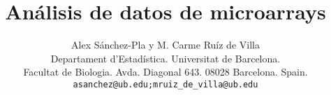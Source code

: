 \title{An\'alisis de datos de microarrays} %


\author{Alex S\'anchez-Pla y M. Carme Ru\'iz de Villa\\
Departament d'Estad\'istica. Universitat de Barcelona.\\
Facultat de Biologia. Avda. Diagonal 643. 08028 Barcelona. Spain.\\
\texttt{asanchez@ub.edu;mruiz\_de\_villa@ub.edu}}

\newcommand{\modul}{M\'odulo 6} %
\newcommand{\credits}{xx} %
\renewcommand{\nroregistre}{PID_00191030} %




\newcommand{\nommodul}{An\'alisis de datos de microarrays} %
\newcommand{\modulEncap}{$\text{ }\bullet$ M\'odulo XXX} %



\usepackage{hyperref} %
\usepackage{Sweave}
\usepackage{supertabular}
\usepackage{underscore}

\newcommand{\Rfunction}[1]{{\texttt{#1}}}
\newcommand{\Rmethod}[1]{{\texttt{#1}}}

\newcommand{\Robject}[1]{{\texttt{#1}}}
\newcommand{\Rpackage}[1]{{\textit{#1}}}
\newcommand{\Rclass}[1]{{\textit{#1}}}

\newcommand{\bit}{\begin{itemize}}
\newcommand{\eit}{\end{itemize}}
\newcommand{\ben}{\begin{enumerate}}
\newcommand{\een}{\end{enumerate}}







\maketitle

